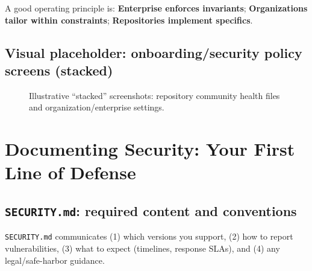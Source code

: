 \documentclass[11pt]{article}
\begin{document}
\begin{notebox}
A good operating principle is: \textbf{Enterprise enforces invariants}; \textbf{Organizations tailor within constraints}; \textbf{Repositories implement specifics}.
\end{notebox}

\subsection{Visual placeholder: onboarding/security policy screens (stacked)}
\begin{figure}[!htbp]
\centering
{}
\caption{Illustrative ``stacked'' screenshots: repository community health files and organization/enterprise settings.}
\end{figure}

\section{Documenting Security: Your First Line of Defense}

\subsection{\texttt{SECURITY.md}: required content and conventions}
\texttt{SECURITY.md} communicates (1) which versions you support, (2) how to report vulnerabilities, (3) what to expect (timelines, response SLAs), and (4) any legal/safe-harbor guidance.
\end{document}
